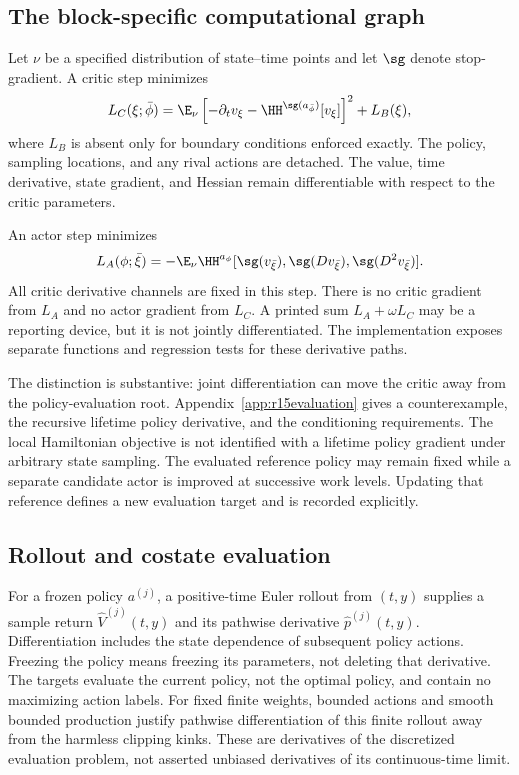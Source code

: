 \subsection{The block-specific computational graph}
Let $\nu$ be a specified distribution of state--time points and let $\sg$ denote stop-gradient. A critic step minimizes
\begin{equation}\label{eq:criticloss}
 L_C(\xi;\bar\phi)=\E_\nu\left[-\partial_t v_\xi-
                 \HH^{\sg(a_{\bar\phi})}[v_\xi]\right]^2+L_B(\xi),
\end{equation}
where $L_B$ is absent only for boundary conditions enforced exactly. The policy, sampling locations, and any rival actions are detached. The value, time derivative, state gradient, and Hessian remain differentiable with respect to the critic parameters.

An actor step minimizes
\begin{equation}\label{eq:actorloss}
 L_A(\phi;\bar\xi)=-\E_\nu\HH^{a_\phi}
 [\sg(v_{\bar\xi}),\sg(Dv_{\bar\xi}),\sg(D^2v_{\bar\xi})].
\end{equation}
All critic derivative channels are fixed in this step. There is no critic gradient from $L_A$ and no actor gradient from $L_C$. A printed sum $L_A+\omega L_C$ may be a reporting device, but it is not jointly differentiated. The implementation exposes separate functions and regression tests for these derivative paths.

The distinction is substantive: joint differentiation can move
the critic away from the policy-evaluation root. Appendix~\ref{app:r15evaluation}
gives a counterexample, the recursive lifetime policy derivative, and the
conditioning requirements. The local Hamiltonian objective is not identified
with a lifetime policy gradient under arbitrary state sampling.
The evaluated reference policy may remain fixed while a separate candidate
actor is improved at successive work levels. Updating that reference defines
a new evaluation target and is recorded explicitly.

\subsection{Rollout and costate evaluation}\label{sec:r11learning}
For a frozen policy $a^{(j)}$, a positive-time Euler rollout from $(t,y)$ supplies a sample return $\widehat V^{(j)}(t,y)$ and its pathwise derivative $\widehat p^{(j)}(t,y)$. Differentiation includes the state dependence of subsequent policy actions. Freezing the policy means freezing its parameters, not deleting that derivative. The targets evaluate the current policy, not the optimal policy, and contain no maximizing action labels. For fixed finite weights, bounded actions and smooth bounded production justify pathwise differentiation of this finite rollout away from the harmless clipping kinks. These are derivatives of the discretized evaluation problem, not asserted unbiased derivatives of its continuous-time limit.

